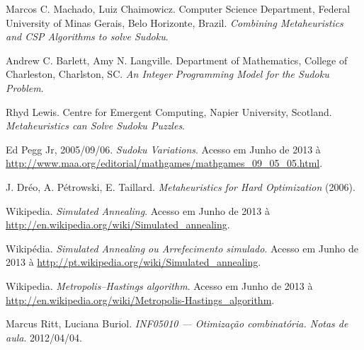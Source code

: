 \nocite{*}
\begin{thebibliography}{99}
  Marcos C. Machado, Luiz Chaimowicz.
  Computer Science Department,
  Federal University of Minas Gerais,
  Belo Horizonte, Brazil.
  \emph{Combining Metaheuristics and CSP Algorithms to solve Sudoku}.
  
  Andrew C. Barlett, Amy N. Langville.
  Department of Mathematics,
  College of Charleston,
  Charlston, SC.
  \emph{An Integer Programming Model for the Sudoku Problem}.

  Rhyd Lewis.
  Centre for Emergent Computing,
  Napier University, Scotland.
  \emph{Metaheuristics can Solve Sudoku Puzzles}.

  Ed Pegg Jr,
  2005/09/06.
  \emph{Sudoku Variations}.
  Acesso em Junho de 2013 à \url{http://www.maa.org/editorial/mathgames/mathgames_09_05_05.html}.

  J. Dréo, A. Pétrowski, E. Taillard.
  \emph{Metaheuristics for Hard Optimization} (2006).

  Wikipedia.
  \emph{Simulated Annealing}.
  Acesso em Junho de 2013 à \url{http://en.wikipedia.org/wiki/Simulated_annealing}.

  Wikipédia.
  \emph{Simulated Annealing ou Arrefecimento simulado}.
  Acesso em Junho de 2013 à \url{http://pt.wikipedia.org/wiki/Simulated_annealing}.

  Wikipedia.
  \emph{Metropolis–Hastings algorithm}.
  Acesso em Junho de 2013 à \url{http://en.wikipedia.org/wiki/Metropolis-Hastings_algorithm}.

  Marcus Ritt, Luciana Buriol.
  \emph{INF05010 --- Otimização combinatória. Notas de aula}.
  2012/04/04.
\end{thebibliography}
